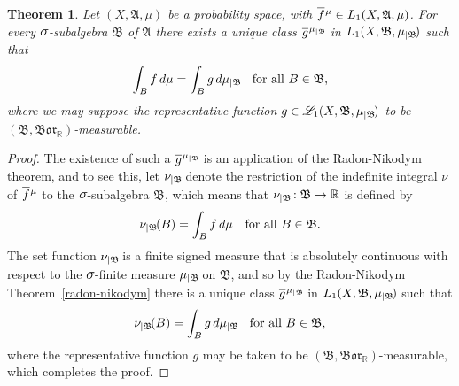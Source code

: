 \documentclass[
twoside=true,
paper=letter,
fontsize=9pt,
pagesize=auto,
leqno,
openany,
headsepline,
overfullrule,
]{scrbook}
\theoremstyle{plain}
\newtheorem{thm}{Theorem}[chapter]
\theoremstyle{plain}
\theoremstyle{definition}
\theoremstyle{bfnoteitalic}
\theoremstyle{bfnoteroman}
\newcommand{\sigalg}[1]{\mathfrak{#1}}
\newcommand{\cali}[1]{\mathscr{#1}}
\newcommand{\borel}{\mathfrak{Bor}}
\newcommand{\textsigma}{\hbox{\large{$\sigma$}}\kern-1pt}
\newcommand{\restrictedto}[1]{_{\lvert#1}\kern-1.5pt}
\newcommand{\R}{\mathbb{R}}
\newcommand{\sigmaalgebra}{\sigalg{A}}
\newcommand{\sigmaalgebraii}{\sigalg{B}}
\newcommand{\function}{f}
\newcommand{\functionii}{g}
\newcommand{\measurespace}{X}
\newcommand{\measure}{\mu}
\newcommand{\measureii}{\nu}
\newcommand*\xbar[1]{%
   \hbox{%
     \vbox{%
       \hrule height 0.4pt %
       \kern0.4ex%
       \hbox{%
         \ensuremath{#1}%
       }%
     }%
   }%
}
\newcommand{\lebclass}[1]{\hspace{.5pt}\xbar{#1}\hspace{0.5pt}}
\newcommand{\ellclass}[2]{\lebclass{#1}^{#2}}
\begin{document}
\begin{thm}\label{existence_of_conditional}
Let $(\measurespace, \sigmaalgebra,\measure)$ be a probability space, with
$\ellclass{\function}{\measure}\in L_1(\measurespace, \sigmaalgebra,\measure)$. For every $\textsigma$-sub\-algebra $\sigmaalgebraii$ of $\sigmaalgebra$ there exists a unique class 
$\ellclass{\functionii}{\measure\restrictedto{\sigmaalgebraii}}$
in
$L_1(\measurespace, \sigmaalgebraii,\measure\restrictedto{\sigmaalgebraii})$ such that
%
\[
\int_B \function\, d\measure = \int_B \functionii\, d\measure\restrictedto{\sigmaalgebraii} 
\quad\text{for all $B \in \sigmaalgebraii$,}
\]
%
where we may suppose the representative function 
$\functionii\in\cali{L}_1(\measurespace, \sigmaalgebraii,\measure\restrictedto{\sigmaalgebraii})$
to be $(\sigmaalgebraii, \borel_\R)$\hyp{}measurable.
\end{thm}


\begin{proof}
The existence of such a  $\ellclass{\functionii}{\measure\restrictedto{\sigmaalgebraii}}$ is an application of the Radon-Nikodym theorem, and to see this, let $\measureii\restrictedto{\sigmaalgebraii}$ denote the restriction of the indefinite integral $\measureii$ of $\ellclass{\function}{\measure}$ to the $\textsigma$-subalgebra $\sigmaalgebraii$, which means that $\measureii\restrictedto{\sigmaalgebraii} :\sigmaalgebraii\to\R$ is defined by
\[
\measureii\restrictedto{\sigmaalgebraii}(B) 
=
\int_B \function\, d\measure
\quad\text{for all $B\in\sigmaalgebraii$.}
\]
The set function $\measureii\restrictedto{\sigmaalgebraii}$ is a finite signed measure that is absolutely continuous with respect to the $\textsigma$-finite measure $\measure\restrictedto{\sigmaalgebraii}$ on $\sigmaalgebraii$, and so by the Radon-Nikodym Theorem~\ref{radon-nikodym} there is a unique class
$\ellclass{\functionii}{\measure\restrictedto{\sigmaalgebraii}}$ in $L_1(\measurespace, \sigmaalgebraii,\measure\restrictedto{\sigmaalgebraii})$ 
such that
\[
\measureii\restrictedto{\sigmaalgebraii}(B) 
= 
\int_B \functionii \, d\measure\restrictedto{\sigmaalgebraii}
\quad\text{for all $B\in\sigmaalgebraii$,}
\]
where the representative function $\functionii$ may be taken to be $(\sigmaalgebraii, \borel_\R)$\hyp{}measurable,
which completes the proof.
\end{proof}  
\end{document}
